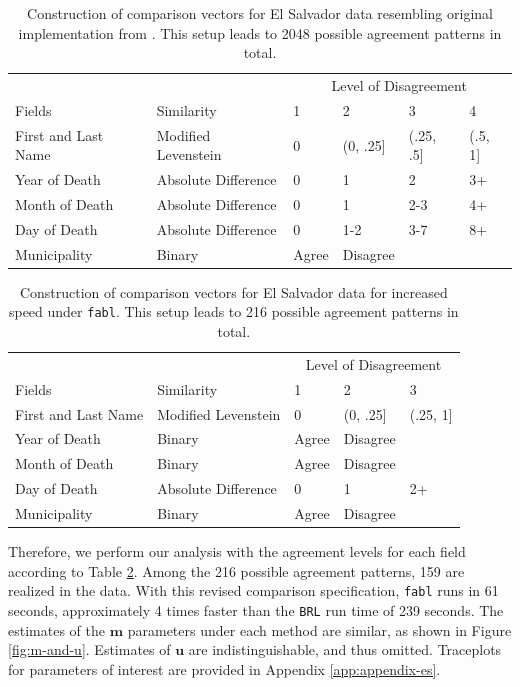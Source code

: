 \documentclass[ba]{imsart}
\begin{document}
	\begin{table}[t]
		\begin{tabular}[t]{llllll}
			\multicolumn{2}{c}{ } & \multicolumn{4}{c}{Level of Disagreement} \\
			\cline{3-6}
			Fields & Similarity & 1 & 2 & 3 & 4\\
			\hline
			First and Last Name & Modified Levenstein & 0 & (0, .25] & (.25, .5] & (.5, 1]\\
			Year of Death & Absolute Difference & 0 & 1 & 2 & 3+\\
			Month of Death & Absolute Difference & 0 & 1 & 2-3 & 4+\\
			Day of Death & Absolute Difference & 0 & 1-2 & 3-7 & 8+\\
			Municipality & Binary & Agree & Disagree &  & \\
			\hline
		\end{tabular}
		\caption{Construction of comparison vectors for El Salvador data resembling original implementation from \cite{sadinle_bayesian_2017}. This setup leads to 2048 possible agreement patterns in total.}\label{Tab:el_salvador_cutoffs_1}
	\end{table}

	\begin{table}[t]
	\centering
	\begin{tabular}[t]{lllll}
		\multicolumn{2}{c}{ } & \multicolumn{3}{c}{Level of Disagreement} \\
		\cline{3-5}
		Fields & Similarity & 1 & 2 & 3\\
		\hline
		First and Last Name & Modified Levenstein & 0 & (0, .25] & (.25, 1]\\
		Year of Death & Binary & Agree & Disagree & \\
		Month of Death & Binary & Agree & Disagree & \\
		Day of Death & Absolute Difference & 0 & 1 & 2+\\
		Municipality & Binary & Agree & Disagree & \\
		\hline
	\end{tabular}
	\caption{Construction of comparison vectors for El Salvador data for increased speed under \texttt{fabl}. This setup leads to 216 possible agreement patterns in total.}\label{Tab:el_salvador_cutoffs_2}
\end{table}
	
	Therefore, we perform our analysis with the agreement levels for each field according to Table \ref{Tab:el_salvador_cutoffs_2}. Among the 216 possible agreement patterns, 159 are realized in the data. With this revised comparison specification, \texttt{fabl} runs in 61 seconds, approximately 4 times faster than the \texttt{BRL} run time of 239 seconds.  The estimates of the $\bm{m}$ parameters under each method are similar, as shown in Figure \ref{fig:m-and-u}. Estimates of $\bm{u}$ are indistinguishable, and thus omitted. Traceplots for parameters of interest are provided in Appendix \ref{app:appendix-es}.
	
\end{document}
